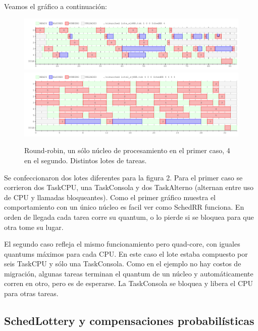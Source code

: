 Veamos el gráfico a continuación:

\begin{figure}[H]
\centering\includegraphics[width=15 cm]{graficos/ej4RR1.png}
\centering\includegraphics[width=15 cm]{graficos/ej4RR2.png}
\caption{Round-robin, un sólo núcleo de procesamiento en el primer caso, 4 en el segundo. Distintos lotes de tareas.}
\end{figure}

Se confeccionaron dos lotes diferentes para la figura 2. Para el primer caso se corrieron dos TaskCPU, una TaskConsola y dos TaskAlterno (alternan entre uso de CPU y llamadas bloqueantes). Como el primer gráfico muestra el comportamiento con un único núcleo es facil ver como SchedRR funciona. En orden de llegada cada tarea corre su quantum, o lo pierde si se bloquea para que otra tome su lugar.

El segundo caso refleja el mismo funcionamiento pero quad-core, con iguales quantums máximos para cada CPU. En este caso el lote estaba compuesto por seis TaskCPU y sólo una TaskConsola. Como en el ejemplo no hay costos de migración, algunas tareas terminan el quantum de un núcleo y automáticamente corren en otro, pero es de esperarse. La TaskConsola se bloquea y libera el CPU para otras tareas.

\subsection{SchedLottery y compensaciones probabilísticas}



%
